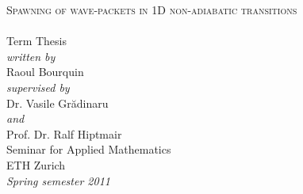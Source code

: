 \begin{titlepage}
\begin{center}
  \hfill
  \vspace{3.0cm}

  {\huge \textsc{Spawning of wave-packets in 1D non-adiabatic transitions\\[10pt]
  }}
  ~\\[20pt]

  {\huge{Term Thesis}}\\[2.5cm]

  {\emph{written by}}\\
  Raoul Bourquin
  \\[0.6cm]
  {\emph{supervised by}}\\
  Dr. Vasile Gr\u{a}dinaru\\
  {\emph{and}}\\
  Prof. Dr. Ralf Hiptmair
  \\[2.5cm]

  Seminar for Applied Mathematics\\
  ETH Zurich
  \\[0.5cm]
  \emph{{Spring semester 2011}}
\end{center}
\end{titlepage}